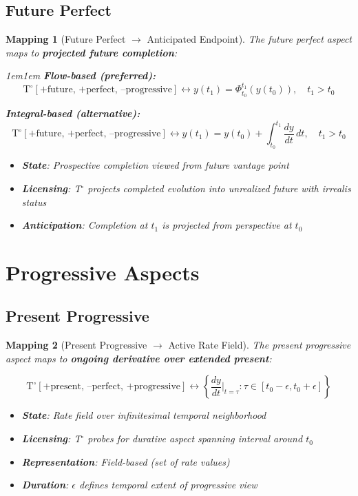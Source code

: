\documentclass[11pt]{article}
\theoremstyle{defstyle}
\theoremstyle{mapstyle}
\newtheorem{mapping}{Mapping}[section]
\begin{document}
\subsection{Future Perfect}

\begin{mapping}[Future Perfect $\to$ Anticipated Endpoint]
The future perfect aspect maps to \textbf{projected future completion}:

\begin{adjustwidth}{1em}{1em}
\noindent\textbf{Flow-based (preferred):}
\[
\boxed{\mathrm{T}^\circ[\text{+future, +perfect, --progressive}] \longleftrightarrow y(t_1) = \Phi_{t_0}^{t_1}(y(t_0)), \quad t_1 > t_0}
\]

\noindent\textbf{Integral-based (alternative):}
\[
\boxed{\mathrm{T}^\circ[\text{+future, +perfect, --progressive}] \longleftrightarrow y(t_1) = y(t_0) + \int_{t_0}^{t_1} \frac{dy}{dt}\,dt, \quad t_1 > t_0}
\]
\end{adjustwidth}

\begin{itemize}
\item \textbf{State}: Prospective completion viewed from future vantage point
\item \textbf{Licensing}: T$^\circ$ projects completed evolution into unrealized future with irrealis status
\item \textbf{Anticipation}: Completion at $t_1$ is projected from perspective at $t_0$
\end{itemize}
\end{mapping}

\vspace{2\baselineskip}

\section{Progressive Aspects}

\subsection{Present Progressive}

\begin{mapping}[Present Progressive $\to$ Active Rate Field]
The present progressive aspect maps to \textbf{ongoing derivative over extended present}:

\[
\boxed{\mathrm{T}^\circ[\text{+present, --perfect, +progressive}] \longleftrightarrow \left\{\frac{dy}{dt}\Big|_{t=\tau} : \tau \in [t_0-\epsilon, t_0+\epsilon]\right\}}
\]

\begin{itemize}
\item \textbf{State}: Rate field over infinitesimal temporal neighborhood
\item \textbf{Licensing}: T$^\circ$ probes for durative aspect spanning interval around $t_0$
\item \textbf{Representation}: Field-based (set of rate values)
\item \textbf{Duration}: $\epsilon$ defines temporal extent of progressive view
\end{itemize}
\end{mapping}
\end{document}
